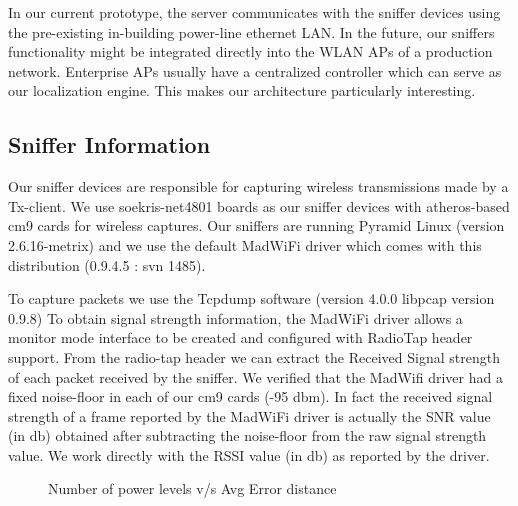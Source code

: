 \documentclass{Localization-PaperWriteupDraft}
\begin{document}
In our current prototype, the server communicates with the sniffer devices using the pre-existing in-building power-line ethernet LAN. In the future, our sniffers functionality might be integrated directly into the WLAN APs of a production network. Enterprise APs usually have a centralized controller which can serve as our localization engine. This makes our architecture particularly interesting.

\subsection{Sniffer Information}
\label{subsec:snifferinformation}

Our sniffer devices are responsible for capturing wireless transmissions made by a Tx-client. We use soekris-net4801 boards as our sniffer
devices with atheros-based cm9 cards for wireless captures. Our sniffers are running Pyramid Linux (version 2.6.16-metrix) and we use the default
MadWiFi driver which comes with this distribution (0.9.4.5 : svn 1485). 

To capture packets we use the Tcpdump software (version 4.0.0 libpcap version 0.9.8) To obtain signal strength information, the MadWiFi driver allows a
monitor mode interface to be created and configured with RadioTap header support. From the radio-tap header we can extract the
Received Signal strength of each packet received by the sniffer. We verified that the MadWifi driver had a fixed noise-floor in each of our
cm9 cards (-95 dbm). In fact the received signal strength of a frame reported by the MadWiFi driver is actually the SNR value (in db) obtained after subtracting the noise-floor from the raw signal strength value. We work directly with the RSSI value (in db) as reported by the driver.

\begin{figure}
	\centering
	\caption{Number of power levels v/s Avg Error distance}
	\label{fig:powerlevelsvserrordistance}
\end{figure}
\end{document}
